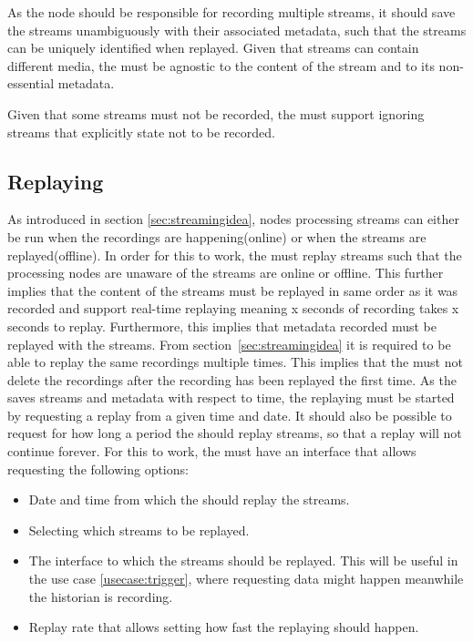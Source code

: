 As the node should be responsible for recording multiple streams, it should save the streams unambiguously with their associated metadata, such that the streams can be uniquely identified when replayed.
Given that streams can contain different media, the  must be agnostic to the content of the stream and to its non-essential metadata.

Given that some streams must not be recorded, the  must support ignoring streams that explicitly state not to be recorded.

\subsection{Replaying}
As introduced in section \ref{sec:streamingidea}, nodes processing streams can either be run when the recordings are happening(online) or when the streams are replayed(offline). In order for this to work, the  must replay streams such that the processing nodes are unaware of the streams are online or offline. This further implies that the content of the streams must be replayed in same order as it was recorded and support real-time replaying meaning x seconds of recording takes x seconds to replay. Furthermore, this implies that metadata recorded must be replayed with the streams. From section~\ref{sec:streamingidea} it is required to be able to replay the same recordings multiple times. This implies that the  must not delete the recordings after the recording has been replayed the first time.
As the  saves streams and metadata with respect to time, the replaying must be started by requesting a replay from a given time and date. It should also be possible to request for how long a period the  should replay streams, so that a replay will not continue forever. For this to work, the  must have an interface that allows requesting the following options:

\begin{itemize}
	\item Date and time from which the  should replay the streams.
	\item Selecting which streams to be replayed.
	\item The interface to which the streams should be replayed. This will be useful in the use case \ref{usecase:trigger}, where requesting data might happen meanwhile the historian is recording.
	\item Replay rate that allows setting how fast the replaying should happen. 
\end{itemize}

